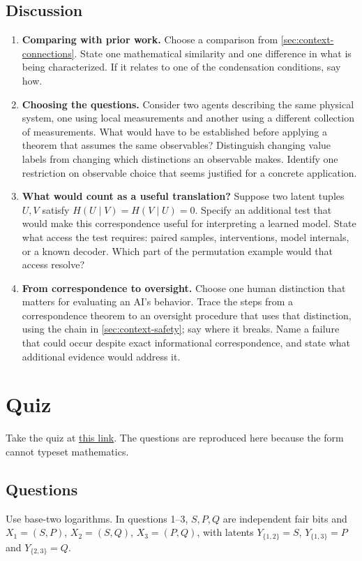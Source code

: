 \documentclass[11pt]{article}
\begin{document}
\subsection{Discussion}
\label{sec:discussion}
\begin{enumerate}
\item \textbf{Comparing with prior work.} Choose a comparison from
\cref{sec:context-connections}. State one mathematical similarity and
one difference in what is being characterized. If it relates to one of the
condensation conditions, say how.
\item \textbf{Choosing the questions.} Consider two agents describing the same
physical system, one using local measurements and another using a different
collection of measurements. What would have to be established before applying
a theorem that assumes the same observables? Distinguish changing value labels
from changing which distinctions an observable makes. Identify one restriction
on observable choice that seems justified for a concrete application.
\item \textbf{What would count as a useful translation?} Suppose two latent tuples $U,V$
satisfy $H(U\mid V)=H(V\mid U)=0$. Specify an additional test
that would make this correspondence useful for interpreting a learned model.
State what access the test requires: paired samples, interventions, model
internals, or a known decoder. Which part of the permutation example would
that access resolve?
\item \textbf{From correspondence to oversight.} Choose one human distinction
that matters for evaluating an AI's behavior. Trace the steps from a
correspondence theorem to an oversight procedure that uses that distinction,
using the chain in \cref{sec:context-safety}; say where it breaks.
Name a failure that could occur despite exact informational correspondence,
and state what additional evidence would address it.
\end{enumerate}

\section{Quiz}
\label{sec:quiz}
Take the quiz at
\href{https://docs.google.com/forms/d/e/1FAIpQLSdTAs3Dq6dOeoju0TsyfaVcEcRdZaNgpAe_FMC7rCR3fohOSw/viewform}{this
link}. The questions are reproduced here because the form cannot typeset
mathematics.

\subsection{Questions}
Use base-two logarithms. In questions 1--3, $S,P,Q$ are independent fair bits and
$X_1=(S,P)$, $X_2=(S,Q)$, $X_3=(P,Q)$, with latents $Y_{\{1,2\}}=S$,
$Y_{\{1,3\}}=P$ and $Y_{\{2,3\}}=Q$.
\end{document}
